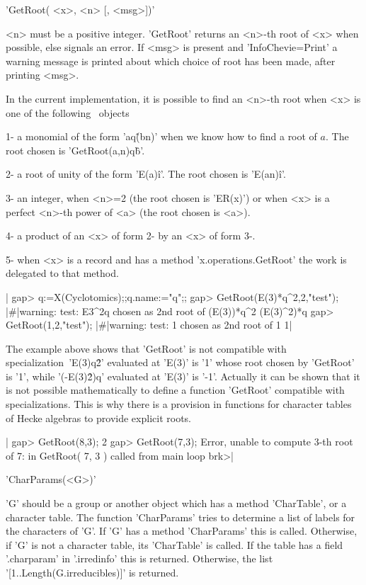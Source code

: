 'GetRoot( <x>, <n> [, <msg>])'

<n> must  be a  positive integer.  'GetRoot' returns  an <n>-th  root of
<x>  when possible,  else  signals an  error. If  <msg>  is present  and
'InfoChevie=Print' a  warning message is  printed about which  choice of
root has been made, after printing <msg>.

In the  current implementation, it  is possible  to find an  <n>-th root
when <x> is one of the following \GAP\ objects\:

1- a monomial of the form 'a\*q\^(b\*n)' when we know how to find a root
of $a$. The root chosen is 'GetRoot(a,n)\*q\^b'.

2-  a  root  of  unity  of  the  form  'E(a)\^i'.  The  root  chosen  is
'E(a\*n)\^i'.

3- an integer, when <n>=2 (the root  chosen is 'ER(x)') or when <x> is a
perfect <n>-th power of <a> (the root chosen is <a>).

4- a product of an <x> of form 2- by an <x> of form 3-.

5- when <x> is a record and has a method 'x.operations.GetRoot' the work
is delegated to that method.

|    gap> q:=X(Cyclotomics);;q.name:="q";;
    gap> GetRoot(E(3)*q^2,2,"test");
    |\#|warning: test: E3^2q chosen as 2nd root of (E(3))*q^2
    (E(3)^2)*q
    gap> GetRoot(1,2,"test");
    |\#|warning: test: 1 chosen as 2nd root of 1
    1|

The  example  above   shows  that  'GetRoot'  is   not  compatible  with
specialization\:\  'E(3)\*q\^2' evaluated  at 'E(3)'  is '1'  whose root
chosen by 'GetRoot' is '1', while '(-E(3)\^2)\*q' evaluated at 'E(3)' is
'-1'. Actually it can be shown that it is not possible mathematically to
define a function 'GetRoot' compatible with specializations. This is why
there is a provision in functions for character tables of Hecke algebras
to provide explicit roots.

|    gap> GetRoot(8,3);
    2
    gap> GetRoot(7,3);
    Error, unable to compute 3-th root of 7:
     in
    GetRoot( 7, 3 ) called from
    main loop
    brk>|

%
%

'CharParams(<G>)'

'G'  should   be  a  group  or   another  object  which  has   a  method
'CharTable', or  a character table.  The function 'CharParams'  tries to
determine a  list of  labels for  the characters  of 'G'.  If 'G'  has a
method  'CharParams'  this  is  called.  Otherwise,  if  'G'  is  not  a
character table,  its 'CharTable' is  called. If  the table has  a field
'.charparam'  in  '.irredinfo' this  is  returned.  Otherwise, the  list
'[1..Length(G.irreducibles)]' is returned.


